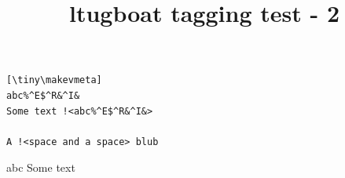 \documentclass{ltugboat}
\title{ltugboat tagging test - 2}
\begin{document}
\bull

\begin{verbatim}[\tiny\makevmeta]
abc%^E$^R&^I&
Some text !<abc%^E$^R&^I&>

A !<space and a space> blub
\end{verbatim}

\begin{verbatim*}[\large]
abc%
Some text
\end{verbatim*}
\end{document}
